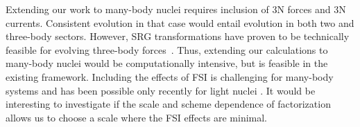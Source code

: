 	Extending our work to many-body nuclei requires inclusion of 3N forces and 3N
	currents.  Consistent evolution in that case would entail evolution in both
	two	and three-body sectors.  However, SRG transformations have proven to be
	technically feasible for evolving three-body
	forces~\cite{Jurgenson:2009qs,Jurgenson:2010wy,Hebeler:2012pr,Wendt:2013bla}.
	Thus, extending our calculations to many-body nuclei would be computationally
	intensive, but is feasible in the existing framework.  Including the effects
	of FSI is challenging for many-body systems and has been
	possible only recently for light nuclei \cite{Bacca:2014tla, Lovato:2015qka}.
	It would be interesting to investigate if the scale and scheme dependence of
	factorization allows us to choose a scale where the FSI effects are minimal.
